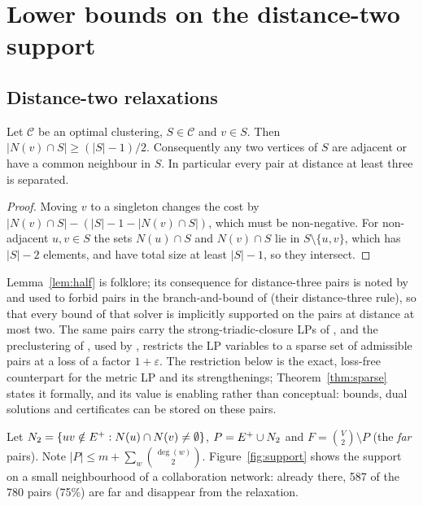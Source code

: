 \section{Lower bounds on the distance-two support}\label{sec:bounds}

\subsection{Distance-two relaxations}\label{sec:relax}

\begin{lemma}\label{lem:half}
Let $\mathcal C$ be an optimal clustering, $S\in\mathcal C$ and $v\in S$.  Then
$|N(v)\cap S|\ge (|S|-1)/2$.  Consequently any two vertices of $S$ are
adjacent or have a common neighbour in $S$.  In particular every pair at
distance at least three is separated.
\end{lemma}
\begin{proof}
Moving $v$ to a singleton changes the cost by $|N(v)\cap S|-(|S|-1-|N(v)\cap
S|)$, which must be non-negative.  For non-adjacent $u,v\in S$ the sets
$N(u)\cap S$ and $N(v)\cap S$ lie in $S\setminus\{u,v\}$, which has $|S|-2$
elements, and have total size at least $|S|-1$, so they intersect.
\end{proof}

Lemma~\ref{lem:half} is folklore; its consequence for distance-three pairs is
noted by \citet{BastosOPSMP16} and used to forbid pairs in the
branch-and-bound of \citet{BlasiusEtAl22sea} (their distance-three rule), so
that every bound of that solver is implicitly supported on the pairs at
distance at most two.  The same pairs carry the strong-triadic-closure LPs of
\citet{veldt2022stc}, and the preclustering of
\citet{CohenAddadLLN23}, used by \citet{CaoCLLNV24}, restricts the LP
variables to a sparse set of admissible pairs at a loss of a factor $1+\varepsilon$.
The restriction below is the exact, loss-free counterpart for the metric LP
and its strengthenings; Theorem~\ref{thm:sparse} states it formally, and its
value is enabling rather than conceptual: bounds, dual solutions and
certificates can be stored on these pairs.

Let $N_{2}=\{uv\notin E^{+}: N(u)\cap N(v)\ne\emptyset\}$, $P=E^{+}\cup N_{2}$ and
$F=\binom V2\setminus P$ (the \emph{far} pairs).  Note
$|P|\le m+\sum_{w}\binom{\deg(w)}{2}$.  Figure~\ref{fig:support} shows
the support on a small neighbourhood of a collaboration network: already
there, 587 of the 780 pairs (75\%) are far and disappear from the relaxation.

